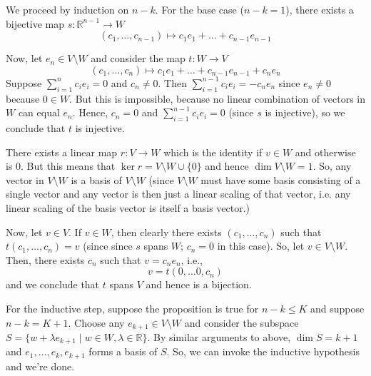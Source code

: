 \documentclass[a4paper]{report}
\newenvironment{ex}[1]
    {\noindent{\large \bf Exercise #1.}}{\vspace{0.5cm}}
\begin{document}
\begin{ex}{1.2.i}
  We proceed by induction on $n-k$. For the base case ($n-k = 1$), there
  exists a bijective map $s : \mathbb{R}^{n-1} \rightarrow W$
  \[
     (c_1, \dots, c_{n-1}) \mapsto c_1e_1 + \dots + c_{n-1}e_{n-1}
  \]

  Now, let $e_n \in V \setminus W$ and consider the map $t : W \rightarrow V$ 
  \[
     (c_1, \dots, c_{n}) \mapsto c_1e_1 + \dots + c_{n-1}e_{n-1} + c_{n}e_{n}
  \]
  Suppose $\sum_{i=1}^{n} c_ie_i = 0$ and $c_{n} \neq 0$. Then
  $\sum_{i=1}^{n-1} c_ie_i = - c_{n}e_{n}$ since $e_{n} \neq 0$
  because $0 \in W$. But this is impossible, because no linear
  combination of vectors in $W$ can equal $e_{n}$. Hence, $c_{n} = 0$
  and $\sum_{i=1}^{n-1} c_ie_i = 0$ (since $s$ is  injective), so we conclude that $t$ is injective.

  There exists a linear map $r : V \rightarrow W$ which is the identity if $v \in W$ and
  otherwise is 0. But this means that $\ker r = V \setminus W \cup \{0\}$ and hence $\dim V \setminus W = 1$.
  So, any vector in $V \setminus W$ is a basis of $V \setminus W$ (since $V \setminus W$ must
  have some basis consisting of a single vector and any vector is then just a linear scaling of that vector, i.e.
  any linear scaling of the basis vector is itself a basis vector.)

  Now, let $v \in V$. If $v \in W$, then clearly there exists $(c_1, \dots, c_{n})$ such that
  $t(c_1, \dots, c_{n}) = v$ (since since $s$ spans $W$; $c_{n} = 0$ in this case). So, let $v \in V \setminus W$.
  Then, there exists $c_n$ such that $v = c_ne_n$, i.e., 
  \[
     v = t(0, \dots 0, c_{n})
     \]
     and we conclude that $t$ spans $V$ and hence is a bijection.

     For the inductive step, suppose the proposition is true for $n -k
     \leq K$ and suppose $n -k = K + 1$. Choose any $e_{k+1} \in V
     \setminus W$ and consider the subspace $S = \{w + \lambda e_{k+1}
     \mid w \in W, \lambda \in \mathbb{R} \}$. By similar arguments to above, $\dim S = k + 1$
     and $e_1, \dots, e_k, e_{k+1}$ forms a basis of $S$.
     So, we can invoke the inductive hypothesis and we're done.
\end{ex}
\end{document}
